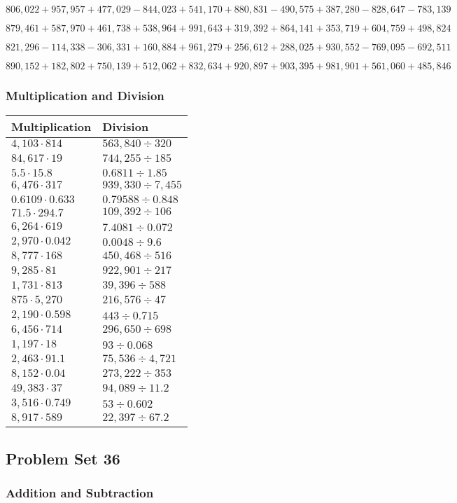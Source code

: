 \(806,022+957,957+477,029-844,023+541,170+880,831-490,575+387,280-828,647-783,139\)

\(879,461+587,970+461,738+538,964+991,643+319,392+864,141+353,719+604,759+498,824\)

\(821,296-114,338-306,331+160,884+961,279+256,612+288,025+930,552-769,095-692,511\)

\(890,152+182,802+750,139+512,062+832,634+920,897+903,395+981,901+561,060+485,846\)

\hypertarget{multiplication-and-division-339}{%
\subsubsection{Multiplication and
Division}\label{multiplication-and-division-339}}

\begin{longtable}[]{@{}ll@{}}
\toprule
Multiplication & Division\tabularnewline
\midrule
\endhead
\(4,103\cdot814\) & \(563,840÷320\)\tabularnewline
\(84,617\cdot19\) & \(744,255÷185\)\tabularnewline
\(5.5\cdot15.8\) & \(0.6811÷1.85\)\tabularnewline
\(6,476\cdot317\) & \(939,330÷7,455\)\tabularnewline
\(0.6109\cdot0.633\) & \(0.79588÷0.848\)\tabularnewline
\(71.5\cdot294.7\) & \(109,392÷106\)\tabularnewline
\(6,264\cdot619\) & \(7.4081÷0.072\)\tabularnewline
\(2,970\cdot0.042\) & \(0.0048÷9.6\)\tabularnewline
\(8,777\cdot168\) & \(450,468÷516\)\tabularnewline
\(9,285\cdot81\) & \(922,901÷217\)\tabularnewline
\(1,731\cdot813\) & \(39,396÷588\)\tabularnewline
\(875\cdot5,270\) & \(216,576÷47\)\tabularnewline
\(2,190\cdot0.598\) & \(443÷0.715\)\tabularnewline
\(6,456\cdot714\) & \(296,650÷698\)\tabularnewline
\(1,197\cdot18\) & \(93÷0.068\)\tabularnewline
\(2,463\cdot91.1\) & \(75,536÷4,721\)\tabularnewline
\(8,152\cdot0.04\) & \(273,222÷353\)\tabularnewline
\(49,383\cdot37\) & \(94,089÷11.2\)\tabularnewline
\(3,516\cdot0.749\) & \(53÷0.602\)\tabularnewline
\(8,917\cdot589\) & \(22,397÷67.2\)\tabularnewline
\bottomrule
\end{longtable}

\hypertarget{problem-set-36-5}{%
\subsection{Problem Set 36}\label{problem-set-36-5}}

\hypertarget{addition-and-subtraction-341}{%
\subsubsection{Addition and
Subtraction}\label{addition-and-subtraction-341}}


